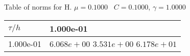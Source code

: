 \begin{center}
Table of norms for H. $\mu = 0.1000$ \, $C = 0.1000$, $\gamma = 1.0000$
  
\begin{tabular}{|p{1in}|p{1in}|} \hline
$\tau / h$ &1.000e-01 \\ \hline 
1.000e-01 & $6.068e+00$  $3.531e+00$  $6.178e+01$  \\ \hline 

\end{tabular}\\[20pt]
\end{center}

